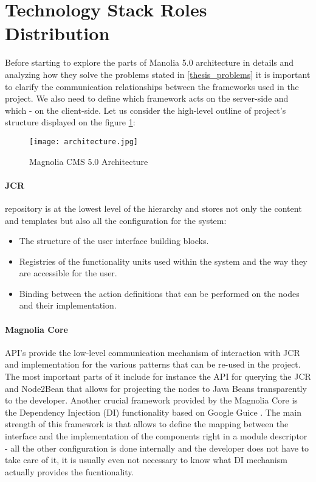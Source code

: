 \section{Technology Stack Roles Distribution} 
Before starting to explore the parts of Manolia 5.0 architecture in details and
analyzing how they solve the problems stated in \ref{thesis_problems} it is
important to clarify the communication relationships between the frameworks used
in the project. We also need to define which framework acts on the server-side
and which - on the client-side. Let us consider the high-level outline of
project's structure displayed on the figure \ref{fig:architecture}:

\begin{figure}[H] \centering \texttt{[image: architecture.jpg]}
	\caption{Magnolia CMS 5.0 Architecture}
	\label{fig:architecture}
\end{figure}

\paragraph{JCR} repository is at the lowest level of the hierarchy and stores
not only the content and templates but also all the configuration for the
system:
\begin{itemize}
  \item The structure of the user interface building blocks.
  \item Registries of the functionality units used within the system and the way
  they are accessible for the user.
  \item Binding between the action definitions that can be performed on the
  nodes and their implementation.
\end{itemize}

\paragraph{Magnolia Core} API's provide the low-level communication mechanism of
interaction with JCR and implementation for the various patterns that can be
re-used in the project. The most important parts of it include for instance the
API for querying the JCR and Node2Bean that allows for projecting the nodes to
Java Beans transparently to the developer. Another crucial framework provided by
the Magnolia Core is the Dependency Injection (DI) functionality based on Google Guice
\cite{google_guice}. The main strength of this framework is that allows to
define the mapping between the interface and the implementation of the
components right in a module descriptor - all the other configuration is done
internally and the developer does not have to take care of it, it is usually even
not necessary to know what DI mechanism actually provides the fucntionality.

